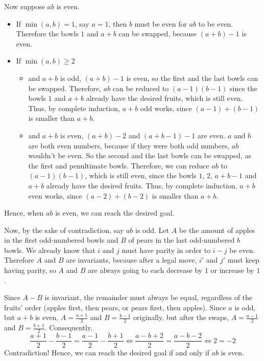 Now suppose $ab$ is even.

\begin{itemize}
	\item If $\min(a,b)=1$, say $a=1$, then $b$ must be even for $ab$ to be even.
	      Therefore the bowls $1$ and $a+b$ can be swapped, because $(a+b)-1$ is
	      even.
	\item If $\min(a,b)\ge 2$
	      \begin{itemize}
		      \item and $a+b$ is odd, $(a+b)-1$ is even, so the first and the last
		            bowls can be swapped. Therefore, $ab$ can be reduced to $(a-1)
			            (b-1)$ since the bowls $1$ and $a+b$ already have the desired
		            fruits, which is still even. Thus, by complete induction, $a+b$
		            odd works, since $(a-1)+(b-1)$ is smaller than $a+b$.
		      \item and $a+b$ is even, $(a+b)-2$ and $(a+b-1)-1$ are even. $a$ and $b$
		            are both even numbers, because if they were both odd numbers, $ab$
		            wouldn't be even. So the
		            second and the last bowls can be swapped, as the first and
		            penultimate bowls. Therefore, we can reduce $ab$ to $(a-1)(b-1)$,
		            which is still even, since the bowls $1$, $2$, $a+b-1$ and $a+b$
		            already have the desired fruits. Thus, by complete induction,
		            $a+b$ even works, since $(a-2)+(b-2)$ is smaller than $a+b$.
	      \end{itemize}
\end{itemize}
Hence, when $ab$ is even, we can reach the desired goal.

Now, by the sake of contradiction, say $ab$ is odd. Let $A$ be the amount of
apples in the first odd-numbered bowls and $B$ of pears in the last odd-numbered
$b$ bowls. We already know that $i$ and $j$ must have parity in order to $i-j$ be
even. Therefore $A$ and $B$ are invariants, because after a legal move, $i'$ and
$j'$ must keep having parity, so $A$ and $B$ are always going to each decrease by
$1$ or increase by $1$.

Since $A-B$ is invariant, the remainder must always be equal, regardless of the fruits'
order (apples first, then pears, or pears first, then apples). Since $a$ is odd,
but $a+b$ is even, $A=\frac{a+1}{2}$ and $B=\frac{b-1}{2}$ originally, but after
the swaps, $A=\frac{a-1}{2}$ and $B=\frac{b+1}{2}$. Consequently,
\[
	\frac{a+1}{2}-\frac{b-1}{2}=\frac{a-1}{2}-\frac{b+1}{2}\iff\frac{a-b+2}{2}=
	\frac{a-b-2}{2}\iff 2=-2
\]
Contradiction! Hence, we can reach the desired goal if and only if $ab$ is even.

